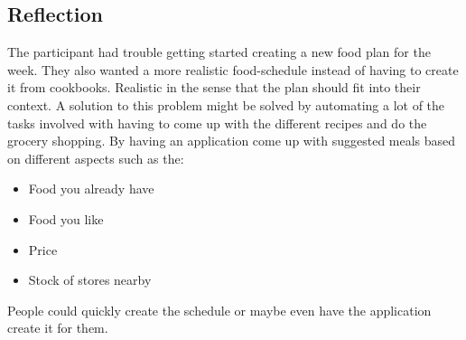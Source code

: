 \subsection{Reflection} 
The participant had trouble getting started creating a new food plan for the week. They also wanted a more realistic food-schedule instead of having to create it from cookbooks. Realistic in the sense that the plan should fit into their context. A solution to this problem might be solved by automating a lot of the tasks involved with having to come up with the different recipes and do the grocery shopping.
By having an application come up with suggested meals based on different aspects such as the:
\begin{itemize}
\item Food you already have
\item Food you like
\item Price
\item Stock of stores nearby
\end{itemize}
People could quickly create the schedule or maybe even have the application create it for them.